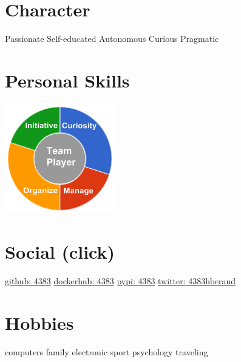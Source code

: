 \documentclass[]{friggeri-cv}
\begin{document}
\begin{aside}
~
~
~
    \section{Character}
        Passionate
        Self-educated
        Autonomous
        Curious
        Pragmatic
        ~
    \section{Personal Skills}
        \includegraphics[scale=0.62]{img/personal.png}
        ~
    \section{Social (click)}
        \href{https://github.com/4383}{github: 4383}
        \href{https://hub.docker.com/r/4383}{dockerhub: 4383}
        \href{https://warehouse.python.org/user/4383/}{pypi: 4383}
        \href{https://twitter.com/4383hberaud}{twitter: 4383hberaud}
        ~
    \section{Hobbies}
        computers
        family
        electronic
        sport
        psychology
        traveling
\end{aside}
\end{document}
